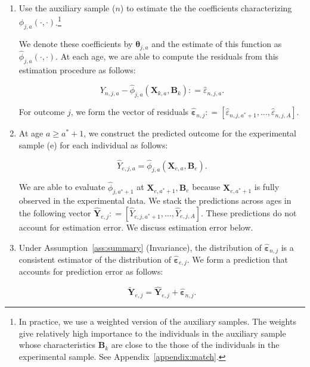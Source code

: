 \begin{enumerate}
\item Use the auxiliary sample ($n$) to estimate the the coefficients characterizing $\phi_{j,a} \left( \cdot , \cdot \right)$.\footnote{In practice, we use a weighted version of the auxiliary samples. The weights give relatively high importance to the individuals in the auxiliary sample whose characteristics $\bm{B}_k$ are close to the those of the individuals in the experimental sample. See Appendix~\ref{appendix:match}.}

We denote these coefficients by $\bm{\theta}_{j,a}$ and the estimate of this function as $\hat{\phi}_{j,a} \left( \cdot , \cdot \right)$. At each age, we are able to compute the residuals from this estimation procedure as follows:

\begin{equation}
Y_{n,j,a} -  \hat{\phi}_{j,a} (\bm{X}_{k,a}, \bm{B}_k) : = \hat{\varepsilon}_{n,j,a}.
\end{equation}

\noindent For outcome $j$, we form the vector of residuals $\hat{\bm{\varepsilon}}_{n,j} : = \left[ \hat{\varepsilon}_{n,j,a^*+1}, \ldots, \hat{\varepsilon}_{n,j,A} \right]$.

\item At age $a \geq a^*+1$, we construct the predicted outcome for the experimental sample (e) for each individual as follows:

\begin{equation}
\hat{Y}_{e,j,a} = \hat{\phi}_{j,a} \left( \bm{X}_{e,a}, \bm{B}_e \right).
\end{equation}

\noindent We are able to evaluate $\hat{\phi}_{j,a^*+1}$ at $ \bm{X}_{e,a^*+1}, \bm{B}_e $ because $\bm{X}_{e,a^*+1}$ is fully observed in the experimental data. We stack the predictions across ages in the following vector $\hat{\bm{Y}}_{e,j} : = \left[ \hat{Y}_{e,j,a^*+1}, \ldots,  \hat{Y}_{e,j,A} \right]$. These predictions do not account for estimation error. We discuss estimation error below.

\item Under Assumption~\ref{ass:summary} (Invariance), the distribution of $\hat{\bm{\varepsilon}}_{n,j}$ is a consistent estimator of the distribution of $\hat{\bm{\varepsilon}}_{e,j}$. We form a prediction that accounts for prediction error as follows:

\begin{equation}
\tilde{\bm{Y}}_{e,j} = \hat{\bm{Y}}_{e,j} + \hat{\bm{\varepsilon}}_{n,j}.
\end{equation}


\end{enumerate}
